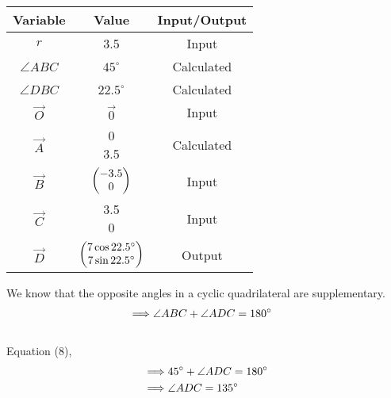 \documentclass[journal,12pt,twocolumn]{IEEEtran}
\begin{document}
\begin{flushleft}
	  \begin{table}[!h]
    \begin{tabular}{|c|c|c|} \hline
        \textbf{Variable} & \textbf{Value}    & \textbf{Input/Output}          \\ \hline
        $r$               & 3.5               & Input          \\ \hline
        $\angle ABC$ &$45^\circ$   &Calculated       \\ \hline    
        $\angle DBC$   &$22.5^\circ$    &Calculated      \\ \hline
        $\vec{O}$       & $\vec{0}$        & Input  \\\hline
        $\vec{A}$       &\myvec{0\\3.5}& Calculated\\\hline
        $\vec{B}$       &  $\begin{pmatrix}-3.5\\0\end{pmatrix}$ & Input\\\hline
        $\vec{C}$       &\myvec{3.5\\0}& Input\\\hline
        $\vec{D}$       & $\begin{pmatrix}7\cos22.5^\circ\\7\sin22.5^\circ\end{pmatrix}$ & Output\\\hline
    \end{tabular}
\end{table}
	  We know that the opposite angles in a cyclic quadrilateral are supplementary.\\
	  \begin{align}&{\implies}\angle{ABC}+\angle{ADC}=180{\degree}\end{align}\\
	  Equation (8),\\
	  \begin{align}&{\implies}45{\degree}+\angle{ADC}=180{\degree}\\
	  &{\implies}\angle{ADC}= 135{\degree} \end{align}\\
	  \therefore {}\\
	  
	
	  

\end{flushleft}	  
	  
	  
	  
     
\end{document}
